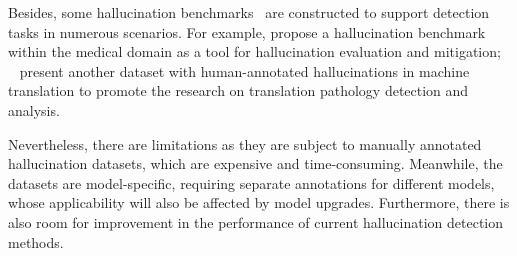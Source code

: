 Besides, some hallucination benchmarks~\citep{li2023halueval,umapathi2023med,dale2023halomi} are constructed to support detection tasks in numerous scenarios. 
For example, \citet{umapathi2023med} propose a hallucination benchmark within the medical domain as a tool for hallucination evaluation and mitigation;
~\citet{dale2023halomi} present another dataset with human-annotated hallucinations in machine translation to promote the research on translation pathology detection and analysis. 

Nevertheless, there are limitations as they are subject to manually annotated hallucination datasets, which are expensive and time-consuming. 
Meanwhile, the datasets are model-specific, requiring separate annotations for different models, whose applicability will also be affected by model upgrades. 
Furthermore, there is also room for improvement in the performance of current hallucination detection methods.









